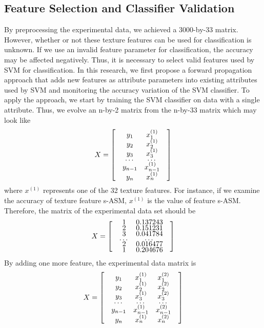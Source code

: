\subsection{Feature Selection and Classifier Validation}
By preprocessing the experimental data, we achieved a 3000-by-33 matrix. However, whether or not these texture features can be used for classification is unknown. If we use an invalid feature parameter for classification, the accuracy may be affected negatively. Thus, it is necessary to select valid features used by SVM for classification. In this research, we first propose a forward propagation approach that adds new features as attribute parameters into existing attributes used by SVM and monitoring the accuracy variation of the SVM classifier. To apply the approach, we start by training the SVM classifier on data with a single attribute. Thus, we evolve an n-by-2 matrix from the n-by-33 matrix which may look like
\begin{align*}
X = 
\renewcommand{\arraystretch}{0.5}
\begin{bmatrix}
 & y_1 & x_1^{(1)} & \\
 & y_2 & x_2^{(1)} & \\
 & y_3 & x_3^{(1)} & \\
 & $\ldots$ & $\ldots$ \\
 & y_{n-1} & x_{n-1}^{(1)} & \\
 & y_n & x_n^{(1)} & \\
\end{bmatrix}
\end{align*}
where $x^{(1)}$ represents one of the 32 texture features. For instance, if we examine the accuracy of texture feature s-ASM, $x^{(1)}$ is the value of feature s-ASM. Therefore, the matrix of the experimental data set should be 
\begin{align*}
X = 
\renewcommand{\arraystretch}{0.5}
\begin{bmatrix}
 & 1 & 0.137243 & \\
 & 2 & 0.151231 & \\
 & 3 & 0.041784 & \\
 & $\ldots$ & $\ldots$ \\
 & 2 & 0.016477 & \\
 & 1 & 0.204676 & \\
\end{bmatrix}
\end{align*}
By adding one more feature, the experimental data matrix is 
\begin{align*}
X = 
\renewcommand{\arraystretch}{0.5}
\begin{bmatrix}
 & y_1 & x_1^{(1)} & x_1^{(2)} &\\
 & y_2 & x_2^{(1)} & x_2^{(2)} &\\
 & y_3 & x_3^{(1)} & x_3^{(2)} &\\
 & $\ldots$ & $\ldots$ & $\ldots$\\
 & y_{n-1} & x_{n-1}^{(1)} & x_{n-1}^{(2)} &\\
 & y_n & x_n^{(1)} & x_n^{(2)} &\\
\end{bmatrix}
\end{align*}
